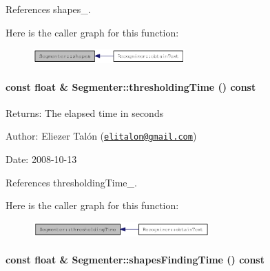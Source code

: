 References shapes\_\-.

Here is the caller graph for this function:\nopagebreak
\begin{figure}[H]
\begin{center}
\leavevmode
\includegraphics[width=166pt]{class_segmenter_7ddded12f26e94e6f5cba2752d2c4142_icgraph}
\end{center}
\end{figure}
\hypertarget{class_segmenter_9114d0f3934b43478fb55077b7722d3d}{
\paragraph[thresholdingTime]{\setlength{\rightskip}{0pt plus 5cm}const float \& Segmenter::thresholdingTime () const}\hfill}
\label{class_segmenter_9114d0f3934b43478fb55077b7722d3d}


\begin{Desc}
\item[Returns:]The elapsed time in seconds\end{Desc}
\begin{Desc}
\item[Author:]Eliezer Talón (\href{mailto:elitalon@gmail.com}{\tt elitalon@gmail.com}) \end{Desc}
\begin{Desc}
\item[Date:]2008-10-13 \end{Desc}


References thresholdingTime\_\-.

Here is the caller graph for this function:\nopagebreak
\begin{figure}[H]
\begin{center}
\leavevmode
\includegraphics[width=192pt]{class_segmenter_9114d0f3934b43478fb55077b7722d3d_icgraph}
\end{center}
\end{figure}
\hypertarget{class_segmenter_8d7304b35b1891b1c7154a3ac2ff2c4b}{
\paragraph[shapesFindingTime]{\setlength{\rightskip}{0pt plus 5cm}const float \& Segmenter::shapesFindingTime () const}\hfill}
\label{class_segmenter_8d7304b35b1891b1c7154a3ac2ff2c4b}


